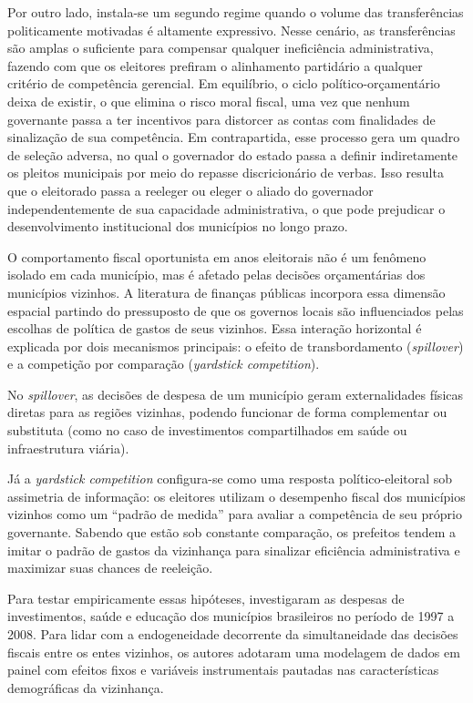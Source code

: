 Por outro lado, instala-se um segundo regime quando o volume das transferências politicamente motivadas é altamente expressivo. Nesse cenário, as transferências são amplas o suficiente para compensar qualquer ineficiência administrativa, fazendo com que os eleitores prefiram o alinhamento partidário a qualquer critério de competência gerencial. Em equilíbrio, o ciclo político-orçamentário deixa de existir, o que elimina o risco moral fiscal, uma vez que nenhum governante passa a ter incentivos para distorcer as contas com finalidades de sinalização de sua competência. Em contrapartida, esse processo gera um quadro de seleção adversa, no qual o governador do estado passa a definir indiretamente os pleitos municipais por meio do repasse discricionário de verbas. Isso resulta que o eleitorado passa a reeleger ou eleger o aliado do governador independentemente de sua capacidade administrativa, o que pode prejudicar o desenvolvimento institucional dos municípios no longo prazo.

O comportamento fiscal oportunista em anos eleitorais não é um fenômeno isolado em cada município, mas é afetado pelas decisões orçamentárias dos municípios vizinhos. A literatura de finanças públicas incorpora essa dimensão espacial partindo do pressuposto de que os governos locais são influenciados pelas escolhas de política de gastos de seus vizinhos. Essa interação horizontal é explicada por dois mecanismos principais: o efeito de transbordamento (\textit{spillover}) e a competição por comparação (\textit{yardstick competition}).

No \textit{spillover}, as decisões de despesa de um município geram externalidades físicas diretas para as regiões vizinhas, podendo funcionar de forma complementar ou substituta (como no caso de investimentos compartilhados em saúde ou infraestrutura viária).

Já a \textit{yardstick competition} configura-se como uma resposta político-eleitoral sob assimetria de informação: os eleitores utilizam o desempenho fiscal dos municípios vizinhos como um ``padrão de medida'' para avaliar a competência de seu próprio governante. Sabendo que estão sob constante comparação, os prefeitos tendem a imitar o padrão de gastos da vizinhança para sinalizar eficiência administrativa e maximizar suas chances de reeleição.

Para testar empiricamente essas hipóteses, \textcite{videira2011} investigaram as despesas de investimentos, saúde e educação dos municípios brasileiros no período de 1997 a 2008. Para lidar com a endogeneidade decorrente da simultaneidade das decisões fiscais entre os entes vizinhos, os autores adotaram uma modelagem de dados em painel com efeitos fixos e variáveis instrumentais pautadas nas características demográficas da vizinhança.

